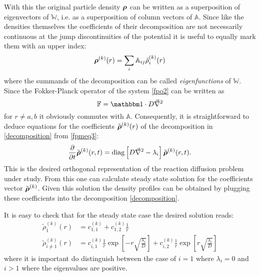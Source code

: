 With this the original particle density $\boldsymbol{\mathbf{\rho}}$ can be written as a superposition of eigenvectors of $\mathbb{W}$, i.e. as a superposition of column vectors of $\mathbb{A}$. Since like the densities themselves the coefficients of their decomposition are not necessarily continuous at the jump discontinuities of the potential it is useful to equally mark them with an upper index:
\begin{equation}
    \boldsymbol{\mathbf{\rho}}^{(k)}(r) = \sum_i \mathbb{A}_{ij}\tilde{\rho}_{i}^{(k)}(r)
    \label{decomposition}
\end{equation}
where the summands of the decomposition can be called \emph{eigenfunctions} of $\mathbb{W}$. \\
Since the Fokker-Planck operator of the system \eqref{fpo2} can be written as 
\begin{equation}
    \mathbb{F} = \unity \cdot D \vec{\nabla}^{2}
    \label{fpunity}
\end{equation}
for $r \ne a, b$ it obviously commutes with $\mathbb{A}$. Consequently, it is straightforward to deduce equations for the coefficients $\tilde{\boldsymbol{\mathbf{\rho}}}^{(k)}(r)$ of the decomposition in \eqref{decomposition} from \eqref{fpmeq3}:
\begin{equation}
    \frac{\partial }{\partial t} \tilde{\boldsymbol{\mathbf{\rho}}}^{(k)}(r,t) = {\rm diag} \left[D \vec{\nabla}^{2} - \lambda_i  \right] \tilde{\boldsymbol{\mathbf{\rho}}}^{(k)}(r,t).
    \label{fpmeq4}
\end{equation}
This is the desired orthogonal representation of the reaction diffusion problem under study. From this one can calculate steady state solution for the coefficients vector $\tilde{\boldsymbol{\mathbf{\rho}}}^{(k)}$. Given this solution the density profiles can be obtained by plugging these coefficients into the decomposition \eqref{decomposition}.
\par
It is easy to check that for the steady state case the desired solution reads:
\begin{align}
    \tilde{\rho}_{1}^{(k)}(r) &= c_{1,1}^{(k)} + c_{1,2}^{(k)} \frac{1}{r} \nonumber \\
    \tilde{\rho}_{i \ne 1}^{(k)}(r) &= c_{i,1}^{(k)}\frac{1}{r} \exp\left[-r\sqrt{\frac{\lambda_i}{D}}\right] + c_{i,2}^{(k)}\frac{1}{r} \exp\left[r\sqrt{\frac{\lambda_i}{D}}\right] 
    \label{fp_ind_sol}
\end{align}
where it is important do distinguish between the case of $i=1$ where $\lambda_i = 0$ and $i>1$ where the eigenvalues are positive.\\


